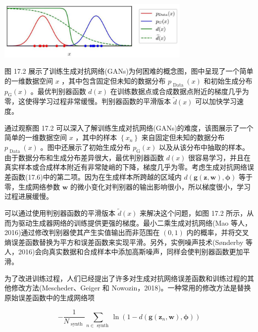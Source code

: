 \documentclass[10pt]{article}
\begin{document}
\begin{center}
\includegraphics[max width=0.7\textwidth]{images/0194e279-9b28-703a-88f4-c3ac21e2010d_556_553_347_918_280_0.jpg}
\end{center}
\hspace*{3em} 

图 17.2 展示了训练生成对抗网络(GANs)为何困难的概念图，图中呈现了一个简单的一维数据空间 \(x\) ，其中包含固定但未知的数据分布 \({p}_{\text{ Data }}\left( x\right)\) 和初始生成分布 \({p}_{\mathrm{G}}\left( x\right)\) 。最优判别器函数 \(d\left( x\right)\) 在训练数据点或合成数据点附近的梯度几乎为零，这使得学习过程非常缓慢。判别器函数的平滑版本 \(\widetilde{d}\left( x\right)\) 可以加快学习速度。

通过观察图 17.2 可以深入了解训练生成对抗网络(GANs)的难度，该图展示了一个简单的一维数据空间 \(x\) ，其中的样本 \(\left\{  {x}_{n}\right\}\) 来自固定但未知的数据分布 \({p}_{\text{ Data }}\left( x\right)\) 。图中还展示了初始生成分布 \({p}_{\mathrm{G}}\left( x\right)\) 以及从该分布中抽取的样本。由于数据分布和生成分布差异很大，最优判别器函数 \(d\left( x\right)\) 很容易学习，并且在真实样本或合成样本附近有非常陡峭的下降，梯度几乎为零。考虑生成对抗网络误差函数(17.6)中的第二项。因为在生成样本所跨越的区域内 \(d\left( {\mathbf{g}\left( {\mathbf{z},\mathbf{w}}\right) ,\mathbf{\phi }}\right)\) 等于零，生成网络参数 \(\mathbf{w}\) 的微小变化对判别器的输出影响很小，所以梯度很小，学习过程进展缓慢。

可以通过使用判别器函数的平滑版本 \(\widetilde{d}\left( x\right)\) 来解决这个问题，如图 17.2 所示，从而为驱动生成器网络的训练提供更强的梯度。最小二乘生成对抗网络(Mao 等人，2016)通过修改判别器使其产生实值输出而非范围在 \(\left( {0,1}\right)\) 内的概率，并将交叉熵误差函数替换为平方和误差函数来实现平滑。另外，实例噪声技术(Sønderby 等人，2016)会向真实数据和合成样本中添加高斯噪声，同样会使判别器函数更加平滑。

为了改进训练过程，人们已经提出了许多对生成对抗网络误差函数和训练过程的其他修改方法(Mescheder、Geiger 和 Nowozin，2018)。一种常用的修改方法是替换原始误差函数中的生成网络项

\[
- \frac{1}{{N}_{\text{ synth }}}\mathop{\sum }\limits_{{n \in  \text{ synth }}}\ln \left( {1 - d\left( {\mathbf{g}\left( {{\mathbf{z}}_{n},\mathbf{w}}\right) ,\mathbf{\phi }}\right) }\right)  \tag{17.9}
\]
\end{document}
